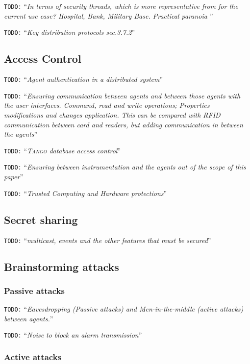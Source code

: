 \documentclass[10pt,a4paper,twoside]{llncs}
\newcommand{\todo}[1]{\texttt{\color{red}TODO:} ``\emph{#1}''}
\newcommand{\tango}{\textsc{Tango} }
\begin{document}
\todo{In terms of security threads, which is more representative from \cite{SecEngRossAnderson} for the current use case? Hospital, Bank, Military Base. Practical paranoia \cite{PractCryptoSchneier}}

\todo{Key distribution protocols \cite{SecEngRossAnderson} sec.3.7.2}

%
\subsection{Access Control}

\todo{Agent authentication in a distributed system}

\todo{Ensuring communication between agents and between those agents with the user interfaces. \emph{Command}, \emph{read} and \emph{write} operations; \emph{Properties} modifications and changes application. This can be compared with \emph{RFID} communication between card and readers, but adding communication in between the agents}

\todo{\tango database access control}

\todo{Ensuring between instrumentation and the agents out of the scope of this paper}

\todo{Trusted Computing and Hardware protections}
%
\subsection{Secret sharing}

\todo{multicast, events and the other features that must be secured}

%
\subsection{Brainstorming attacks}

%
\subsubsection{Passive attacks}

\todo{Eavesdropping (Passive attacks) and Men-in-the-middle (active attacks) between agents.}

\todo{Noise to block an alarm transmission}

%
\subsubsection{Active attacks}
\end{document}
